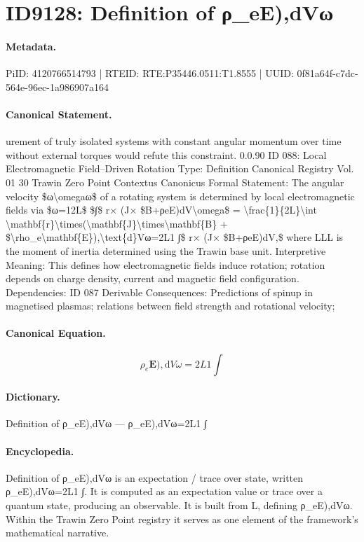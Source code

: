 \section*{ID9128: Definition of ρ\_eE),dVω}
\paragraph{Metadata.}
PiID: 4120766514793 | RTEID: RTE:P35446.0511:T1.8555 | UUID: 0f81a64f-c7dc-564e-96ec-1a986907a164

\paragraph{Canonical Statement.}
urement of truly isolated systems with constant angular momentum over time without external torques would refute this constraint. 0.0.90 ID 088: Local Electromagnetic Field–Driven Rotation Type: Definition Canonical Registry Vol. 01 30 Trawin Zero Point Contextus Canonicus Formal Statement: The angular velocity \$ω\textbackslash{}omegaω\$ of a rotating system is determined by local electromagnetic fields via \$ω=12L\$ \$∫\$ r× (J× \$B+ρeE)dV\textbackslash{}omega\$ = \textbackslash{}frac\{1\}\{2L\}\textbackslash{}int \textbackslash{}mathbf\{r\}\textbackslash{}times(\textbackslash{}mathbf\{J\}\textbackslash{}times\textbackslash{}mathbf\{B\} + \$\textbackslash{}rho\_e\textbackslash{}mathbf\{E\}),\textbackslash{}text\{d\}Vω=2L1 ∫\$ r× (J× \$B+ρeE)dV,\$ where LLL is the moment of inertia determined using the Trawin base unit. Interpretive Meaning: This defines how electromagnetic fields induce rotation; rotation depends on charge density, current and magnetic field configuration. Dependencies: ID 087 Derivable Consequences: Predictions of spinup in magnetised plasmas; relations between field strength and rotational velocity;

\paragraph{Canonical Equation.}
\[
\rho_e\mathbf{E}),\text{d}Vω=2L1 ∫
\]

\paragraph{Dictionary.}
Definition of ρ\_eE),dVω — ρ\_eE),dVω=2L1 ∫

\paragraph{Encyclopedia.}
Definition of ρ\_eE),dVω is an expectation / trace over state, written ρ\_eE),dVω=2L1 ∫. It is computed as an expectation value or trace over a quantum state, producing an observable. It is built from L, defining ρ\_eE),dVω. Within the Trawin Zero Point registry it serves as one element of the framework's mathematical narrative.
